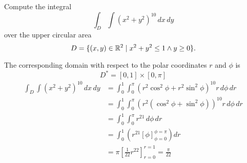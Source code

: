 \begin{exercise}
	Compute the integral
	$$
		\int_D \int (x^2 + y^2)^{10} \, dx \, dy
	$$
	over the upper circular area
	$$
		D = \{(x,y) \in \mathbb{R}^2 \mid x^2 + y^2 \leq 1 \wedge y \geq 0 \}.
	$$
\end{exercise}

\begin{solution}
	The corresponding domain with respect to the polar coordinates $r$ and $\phi$ is
	$$
		D^* = [0, 1] \times [0, \pi]
	$$
	$$
		\begin{aligned}
			\int_D \int (x^2 + y^2)^{10} \, dx \, dy & = \int_0^1 \int_0^\pi (r^2 \cos^2 \phi + r^2 \sin^2 \phi)^{10} r \, d\phi \, dr \\
			                                         & = \int_0^1 \int_0^\pi (r^2 ( \cos^2 \phi + \sin^2 \phi ))^{10} r \, d\phi \, dr \\
			                                         & = \int_0^1 \int_0^\pi r^{21} \, d\phi \, dr                                     \\
			                                         & = \int_0^1 \left( r^{21} \left[ \phi \right]_{\phi=0}^{\phi=\pi} \right) dr     \\
			                                         & =\pi \left[ \frac{1}{22} r^{22} \right]_{r=0}^{r=1} = \frac{\pi}{22}
		\end{aligned}
	$$
\end{solution}
